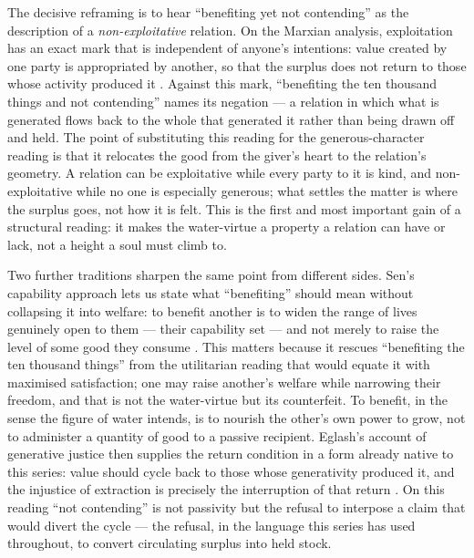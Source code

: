 The decisive reframing is to hear ``benefiting yet not contending'' as the description of a \emph{non-exploitative} relation. On the Marxian analysis, exploitation has an exact mark that is independent of anyone's intentions: value created by one party is appropriated by another, so that the surplus does not return to those whose activity produced it \parencite{marx1976}. Against this mark, ``benefiting the ten thousand things and not contending'' names its negation --- a relation in which what is generated flows back to the whole that generated it rather than being drawn off and held. The point of substituting this reading for the generous-character reading is that it relocates the good from the giver's heart to the relation's geometry. A relation can be exploitative while every party to it is kind, and non-exploitative while no one is especially generous; what settles the matter is where the surplus goes, not how it is felt. This is the first and most important gain of a structural reading: it makes the water-virtue a property a relation can have or lack, not a height a soul must climb to.

Two further traditions sharpen the same point from different sides. Sen's capability approach lets us state what ``benefiting'' should mean without collapsing it into welfare: to benefit another is to widen the range of lives genuinely open to them --- their capability set --- and not merely to raise the level of some good they consume \parencite{sen1999}. This matters because it rescues ``benefiting the ten thousand things'' from the utilitarian reading that would equate it with maximised satisfaction; one may raise another's welfare while narrowing their freedom, and that is not the water-virtue but its counterfeit. To benefit, in the sense the figure of water intends, is to nourish the other's own power to grow, not to administer a quantity of good to a passive recipient. Eglash's account of generative justice then supplies the return condition in a form already native to this series: value should cycle back to those whose generativity produced it, and the injustice of extraction is precisely the interruption of that return \parencite{eglash2016,eglash1999}. On this reading ``not contending'' is not passivity but the refusal to interpose a claim that would divert the cycle --- the refusal, in the language this series has used throughout, to convert circulating surplus into held stock.

